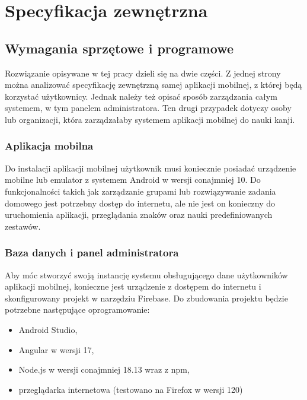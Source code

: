 \documentclass[a4paper,twoside,12pt]{book}
\begin{document}
\chapter{Specyfikacja zewnętrzna}
\label{ch:04}

\section{Wymagania sprzętowe i programowe}
Rozwiązanie opisywane w tej pracy dzieli się na dwie części. Z jednej strony można analizować specyfikację zewnętrzną samej aplikacji mobilnej, z której będą korzystać użytkownicy. Jednak należy też opisać sposób zarządzania całym systemem, w tym panelem administratora. Ten drugi przypadek dotyczy osoby lub organizacji, która zarządzałaby systemem aplikacji mobilnej do nauki kanji.

\subsection{Aplikacja mobilna}

Do instalacji aplikacji mobilnej użytkownik musi koniecznie posiadać urządzenie mobilne lub emulator z systemem Android w wersji conajmniej 10. Do funkcjonalności takich jak zarządzanie grupami lub rozwiązywanie zadania domowego jest potrzebny dostęp do internetu, ale nie jest on konieczny do uruchomienia aplikacji, przeglądania znaków oraz nauki predefiniowanych zestawów. 

\subsection{Baza danych i panel administratora}

Aby móc stworzyć swoją instancję systemu obsługującego dane użytkowników aplikacji mobilnej, konieczne jest urządzenie z dostępem do internetu i skonfigurowany projekt w narzędziu Firebase. Do zbudowania projektu będzie potrzebne następujące oprogramowanie:
\begin{itemize}
\item Android Studio,
\item Angular w wersji 17,
\item Node.js w wersji conajmniej 18.13 wraz z npm,
\item przeglądarka internetowa (testowano na Firefox w wersji 120)
\end{itemize}
\end{document}
